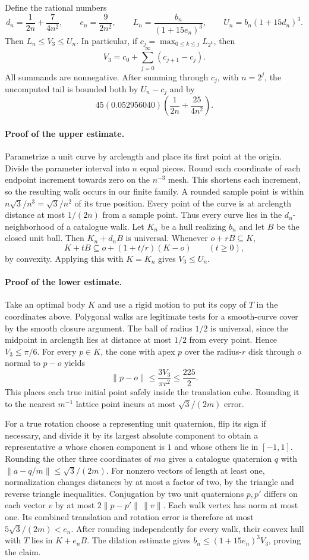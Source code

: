 Define the rational numbers
\[
   d_n=\frac1{2n}+\frac7{4n^2},\qquad
   e_n=\frac9{2n^2},\qquad
   L_n=\frac{b_n}{(1+15e_n)^3},\qquad
   U_n=b_n(1+15d_n)^3.
\]
Then $L_n\le V_3\le U_n$. In particular, if
$c_j=\max_{0\le k\le j}L_{2^k}$, then
\[
  \boxed{\displaystyle V_3=c_0+\sum_{j=0}^{\infty}(c_{j+1}-c_j).}
\]
All summands are nonnegative. After summing through $c_j$, with $n=2^j$,
the uncomputed tail is bounded both by $U_n-c_j$ and by
\[
 45(0.052956040)\left(\frac1{2n}+\frac{25}{4n^2}\right).
\]

\paragraph{Proof of the upper estimate.}
Parametrize a unit curve by arclength and place its first point at the
origin. Divide the parameter interval into $n$ equal pieces. Round each
coordinate of each endpoint increment towards zero on the $n^{-3}$
mesh. This shortens each increment, so the resulting walk occurs in our
finite family. A rounded sample point is within
$n\sqrt3/n^3=\sqrt3/n^2$ of its true position. Every point of the
curve is at arclength distance at most $1/(2n)$ from a sample point.
Thus every curve lies in the $d_n$-neighborhood of a catalogue walk.
Let $K_n$ be a hull realizing $b_n$ and let $B$ be the closed unit ball.
Then $K_n+d_n B$ is universal. Whenever $o+rB\subseteq K$,
\[
  K+tB\subseteq o+(1+t/r)(K-o)\qquad(t\ge0),
\]
by convexity. Applying this with $K=K_n$ gives $V_3\le U_n$.

\paragraph{Proof of the lower estimate.}
Take an optimal body $K$ and use a rigid motion to put its copy of $T$
in the coordinates above. Polygonal walks are legitimate tests for a
smooth-curve cover by the smooth closure argument. The ball of radius
$1/2$ is universal, since the midpoint in arclength lies at distance at
most $1/2$ from every point. Hence $V_3\le\pi/6$. For every $p\in K$,
the cone with apex $p$ over the radius-$r$ disk through $o$ normal to
$p-o$ yields
\[
   \|p-o\|\le \frac{3V_3}{\pi r^2}\le\frac{225}{2}.
\]
This places each true initial point safely inside the translation cube.
Rounding it to the nearest $m^{-1}$ lattice point incurs at most
$\sqrt3/(2m)$ error.

For a true rotation choose a representing unit quaternion, flip its sign
if necessary, and divide it by its largest absolute component to obtain
a representative $a$ whose chosen component is $1$ and whose others
lie in $[-1,1]$. Rounding the other three coordinates of $ma$ gives a
catalogue quaternion $q$ with $\|a-q/m\|\le\sqrt3/(2m)$. For nonzero
vectors of length at least one, normalization changes distances by at
most a factor of two, by the triangle and reverse triangle inequalities.
Conjugation by two unit quaternions $p,p'$ differs on each vector $v$ by
at most $2\|p-p'\|\,\|v\|$. Each walk vertex has norm at most one.
Its combined translation and rotation error is therefore at most
$5\sqrt3/(2m)<e_n$. After rounding independently for every walk, their
convex hull with $T$ lies in $K+e_n B$. The dilation estimate gives
$b_n\le(1+15e_n)^3V_3$, proving the claim.


